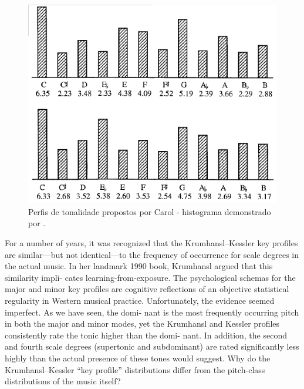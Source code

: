 \documentclass[
	12pt,				%
	openright,			%
	twoside,			%
	a4paper,			%
	english,			%
	french,				%
	spanish,			%
	brazil				%
	]{abntex2}
\begin{document}
\begin{figure}[!h]
	\caption{\label{fig_grafico}Perfis de tonalidade propostos por Carol  - histograma demonstrado por . }
	\begin{center}
	    \includegraphics[scale=0.6]{CBMS/krumhansl_temperley_p174.png}
	\end{center}
\end{figure}





For a number of years, it was recognized that the Krumhansl–Kessler key profiles are
similar—but not identical—to the frequency of occurrence for scale degrees in the
actual music. In her landmark 1990 book, Krumhansl argued that this similarity impli-
cates learning-from-exposure. The psychological schemas for the major and minor key
profiles are cognitive reflections of an objective statistical regularity in Western musical
practice. Unfortunately, the evidence seemed imperfect. As we have seen, the domi-
nant is the most frequently occurring pitch in both the major and minor modes, yet
the Krumhansl and Kessler profiles consistently rate the tonic higher than the domi-
nant. In addition, the second and fourth scale degrees (supertonic and subdominant)
are rated significantly less highly than the actual presence of these tones would
suggest. Why do the Krumhansl–Kessler “key profile” distributions differ from the
pitch-class distributions of the music itself?
\end{document}
